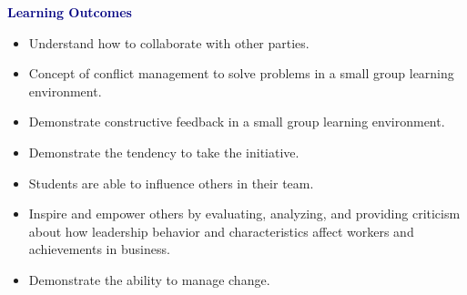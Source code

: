 \begin{minipage}[t]{.66\textwidth}\vspace{0pt}
\textcolor{navy}{\large\bfseries Learning Outcomes}\par
\begin{itemize}
\item Understand how to collaborate with other parties.
\item Concept of conflict management to solve problems in a small group learning environment.
\item Demonstrate constructive feedback in a small group learning environment.
\item Demonstrate the tendency to take the initiative.
\item Students are able to influence others in their team.
\item Inspire and empower others by evaluating, analyzing, and providing criticism about how leadership behavior and characteristics affect workers and achievements in business.
\item Demonstrate the ability to manage change.
\end{itemize}
\end{minipage}\hfill
\begin{minipage}[t]{.32\textwidth}\vspace{0pt}
\end{minipage}
